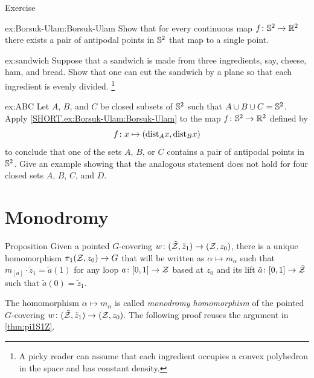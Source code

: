 {\begin{thm}{Exercise}\label{ex:Borsuk-Ulam}

\begin{subthm}{ex:Borsuk-Ulam:Borsuk-Ulam}
Show that for every continuous map $f\colon \mathbb{S}^2\to \mathbb{R}^2$ there exists a pair of antipodal
points in $\mathbb{S}^2$ that map to a single point.
\end{subthm}

\begin{subthm}{ex:sandwich}
Suppose that a sandwich is made from three ingredients, say, cheese, ham, and bread.
Show that one can cut the sandwich by a plane so that each ingredient is evenly divided.%
\footnote{A picky reader can assume that each ingredient occupies a convex polyhedron in the space and has constant density.}
\end{subthm}


\begin{subthm}{ex:ABC}
Let $A$, $B$, and $C$ be closed subsets of $\mathbb{S}^2$ such that $A\cup B\cup C=\mathbb{S}^2$.
Apply \ref{SHORT.ex:Borsuk-Ulam:Borsuk-Ulam} to the map $f\: \SS^2\z\to \RR^2$ defined by
\[f\colon x\mapsto (\mathrm{dist}_Ax,\mathrm{dist}_Bx)\]
to conclude that one of the sets $A$, $B$, or $C$
contains a pair of antipodal
points in $\mathbb{S}^2$.
Give an example showing that the analogous statement does not hold for four closed sets $A$, $B$, $C$, and $D$.
\end{subthm}

\end{thm}


\section{Monodromy}\label{sec:monodromy}

\begin{thm}{Proposition}\label{prop:monodromy-homo}
Given a pointed $G$-covering $w\colon(\tilde{\mathcal{Z}},\tilde z_1)\to(\mathcal{Z},z_0)$, there is a unique homomorphism $\pi_1(\mathcal{Z},z_0)\to G$ that will be written as $\alpha\mapsto m_\alpha$ such that
$m_{[a]}\cdot \tilde z_1=\tilde a(1)$ for any loop $a\colon[0,1]\to \mathcal{Z}$ based at $z_0$ and its lift $\tilde a\colon[0,1]\to \tilde{\mathcal{Z}}$ such that $\tilde a(0)=\tilde z_1$.

\end{thm}

The homomorphism $\alpha\mapsto m_\alpha$ is called \emph{monodromy homomorphism} of the pointed $G$-covering $w\colon(\tilde{\mathcal{Z}},\tilde z_1)\to(\mathcal{Z},z_0)$.
The following proof reuses the argument in \ref{thm:pi1S1Z}.

}

